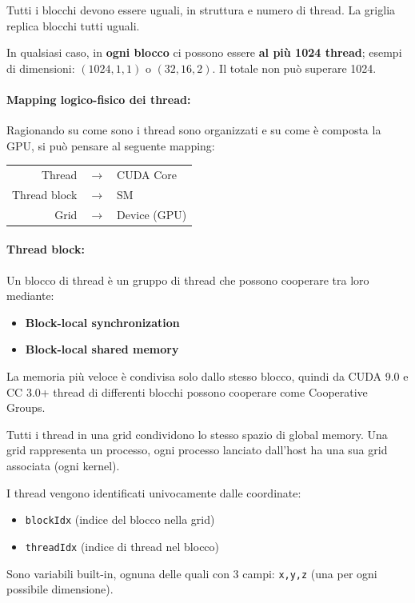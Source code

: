 Tutti i blocchi devono essere uguali, in struttura e numero di thread. La griglia replica blocchi tutti uguali.

In qualsiasi caso, in \textbf{ogni blocco} ci possono essere \textbf{al più 1024 thread}; esempi di dimensioni: $(1024, 1, 1)$  o $(32, 16, 2)$. Il totale non può superare 1024.

\paragraph{Mapping logico-fisico dei thread:} Ragionando su come sono i thread sono organizzati e su come è composta la GPU, si può pensare al seguente mapping:

\begin{tabular}{r c l}
	Thread & $\rightarrow$ & CUDA Core \\
	Thread block & $\rightarrow$ & SM \\
	Grid & $\rightarrow$ & Device (GPU)
\end{tabular}

\paragraph{Thread block:} Un blocco di thread è un gruppo di thread che possono cooperare tra loro mediante:
\begin{itemize}
	\item \textbf{Block-local synchronization}
	
	\item \textbf{Block-local shared memory}
\end{itemize}

La memoria più veloce è condivisa solo dallo stesso blocco, quindi da CUDA 9.0 e CC 3.0+ thread di differenti blocchi possono cooperare come Cooperative Groups.

Tutti i thread in una grid condividono lo stesso spazio di global memory. Una grid rappresenta un processo, ogni processo lanciato dall'host ha una sua grid associata (ogni kernel).

I thread vengono identificati univocamente dalle coordinate: 
\begin{itemize}
	\item \texttt{blockIdx} (indice del blocco nella grid)
	
	\item \texttt{threadIdx} (indice di thread nel blocco)
\end{itemize}

Sono variabili built-in, ognuna delle quali con 3 campi: \texttt{x,y,z} (una per ogni possibile dimensione).

